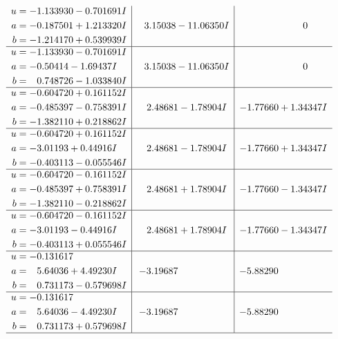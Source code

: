 \documentclass[1p]{elsarticle_modified}
\theoremstyle{definition}
\begin{document}
$$\begin{array}{c|c|c}
\begin{aligned}
u &= -1.133930 - 0.701691 I \\
a &= -0.187501 + 1.213320 I \\
b &= -1.214170 + 0.539939 I\end{aligned}
 & \phantom{-}3.15038 - 11.06350 I & \phantom{-0.000000 } 0 \\ \hline\begin{aligned}
u &= -1.133930 - 0.701691 I \\
a &= -0.50414 - 1.69437 I \\
b &= \phantom{-}0.748726 - 1.033840 I\end{aligned}
 & \phantom{-}3.15038 - 11.06350 I & \phantom{-0.000000 } 0 \\ \hline\begin{aligned}
u &= -0.604720 + 0.161152 I \\
a &= -0.485397 - 0.758391 I \\
b &= -1.382110 + 0.218862 I\end{aligned}
 & \phantom{-}2.48681 - 1.78904 I & -1.77660 + 1.34347 I \\ \hline\begin{aligned}
u &= -0.604720 + 0.161152 I \\
a &= -3.01193 + 0.44916 I \\
b &= -0.403113 - 0.055546 I\end{aligned}
 & \phantom{-}2.48681 - 1.78904 I & -1.77660 + 1.34347 I \\ \hline\begin{aligned}
u &= -0.604720 - 0.161152 I \\
a &= -0.485397 + 0.758391 I \\
b &= -1.382110 - 0.218862 I\end{aligned}
 & \phantom{-}2.48681 + 1.78904 I & -1.77660 - 1.34347 I \\ \hline\begin{aligned}
u &= -0.604720 - 0.161152 I \\
a &= -3.01193 - 0.44916 I \\
b &= -0.403113 + 0.055546 I\end{aligned}
 & \phantom{-}2.48681 + 1.78904 I & -1.77660 - 1.34347 I \\ \hline\begin{aligned}
u &= -0.131617\phantom{ +0.000000I} \\
a &= \phantom{-}5.64036 + 4.49230 I \\
b &= \phantom{-}0.731173 - 0.579698 I\end{aligned}
 & -3.19687\phantom{ +0.000000I} & -5.88290\phantom{ +0.000000I} \\ \hline\begin{aligned}
u &= -0.131617\phantom{ +0.000000I} \\
a &= \phantom{-}5.64036 - 4.49230 I \\
b &= \phantom{-}0.731173 + 0.579698 I\end{aligned}
 & -3.19687\phantom{ +0.000000I} & -5.88290\phantom{ +0.000000I}\\
 \hline 
 \end{array}$$\newpage\newpage\renewcommand{\arraystretch}{1}
\end{document}
